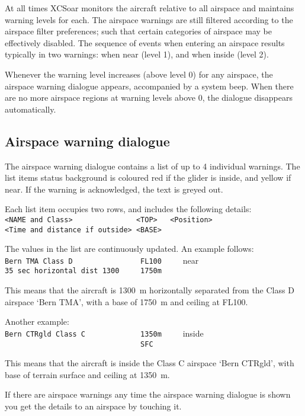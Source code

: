 At all times XCSoar monitors the aircraft relative to all airspace and
maintains warning levels for each.  The airspace warnings are still
filtered according to the airspace filter preferences; such that
certain categories of airspace may be effectively disabled.
The sequence of events when entering an airspace results typically
in two warnings: when near (level 1), and when inside (level 2).

Whenever the warning level increases (above level 0) for any airspace,
the airspace warning dialogue appears, accompanied by a system beep.
When there are no more airspace regions at warning levels above
0, the dialogue disappears automatically.


\subsection*{Airspace warning dialogue}

The airspace warning dialogue contains a list of up to 4 individual
warnings.  The list items status background is coloured red if the glider is
inside, and yellow if near.  If the warning is acknowledged, the
text is greyed out.

Each list item occupies two rows, and includes the following details:\\
\verb+<NAME and Class>               <TOP>   <Position>+\\
\verb+<Time and distance if outside> <BASE>+

The values in the list are continuously updated. 
An example follows:\\
\verb+Bern TMA Class D                FL100     +\colorbox{AirspaceYellow}{near}\\
\verb+35 sec horizontal dist 1300     1750m+

This means that the aircraft is 1300~m horizontally separated from the Class D airspace
`Bern TMA', with a base of 1750~m and ceiling at FL100.

Another example:\\
\verb+Bern CTRgld Class C             1350m     +\colorbox{AirspaceRed}{inside}\\
\verb+                                SFC+

This means that the aircraft is inside the Class C airspace `Bern
CTRgld', with base of terrain surface and ceiling at 1350~m.

If there are airspace warnings any time the airspace warning dialogue is shown 
you get the details to an airspace by touching it.


